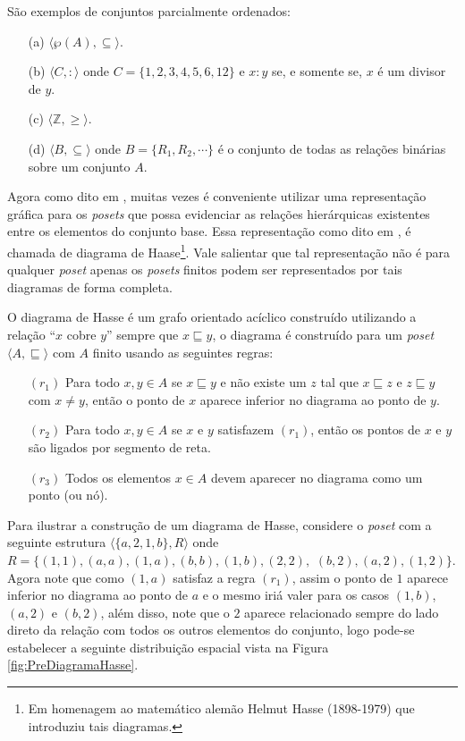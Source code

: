 \begin{exemplo}
	São exemplos de conjuntos parcialmente ordenados:
	\begin{itemize}
		\item[(a)] $\langle \wp(A), \subseteq \rangle$.
		\item[(b)] $\langle C,  : \rangle$ onde $C = \{1, 2, 3, 4, 5, 6, 12\}$ e $x : y$ se, e somente se, $x$ é um divisor de $y$.
		\item[(c)] $\langle \mathbb{Z}, \geq \rangle$.
		\item[(d)] $\langle B, \subseteq \rangle$ onde $B = \{R_1, R_2, \cdots\}$ é o conjunto de todas as relações binárias sobre um conjunto $A$.
	\end{itemize}
\end{exemplo}

Agora como dito em \cite{morgado1962poset}, muitas vezes é conveniente utilizar uma representação gráfica para os \textit{posets} que possa evidenciar as relações hierárquicas existentes entre os elementos do conjunto base. Essa representação como dito em \cite{abe1991-TC}, é chamada de diagrama de Haase\footnote{Em homenagem ao matemático alemão Helmut Hasse (1898-1979) que introduziu tais diagramas.}. Vale salientar que tal representação não é para qualquer \textit{poset} apenas os \textit{posets} finitos podem ser representados por tais diagramas de forma completa.

O diagrama de Hasse é um grafo orientado acíclico construído utilizando a relação ``$x$ cobre $y$'' sempre que $x \sqsubseteq y$, o diagrama é construído para um \textit{poset} $\langle A, \sqsubseteq \rangle$ com $A$ finito usando as seguintes regras:

\begin{itemize}
	\item[$(r_1)$] Para todo $x, y \in A$ se $x \sqsubseteq  y$ e não existe um $z$ tal que $x \sqsubseteq  z$ e $z \sqsubseteq  y$ com $x \neq y$, então o ponto de $x$ aparece inferior no diagrama ao ponto de $y$.
	\item[$(r_2)$] Para todo $x, y \in A$ se $x$ e $y$ satisfazem $(r_1)$, então os pontos de $x$ e $y$ são ligados por segmento de reta.
	\item[$(r_3)$] Todos os elementos $x \in A$ devem aparecer no diagrama como um ponto (ou nó).
\end{itemize}

Para ilustrar a construção de um diagrama de Hasse, considere o \textit{poset} com a seguinte estrutura $\langle \{a, 2, 1, b\}, R \rangle$ onde $R = \{(1, 1), (a, a), (1, a), (b, b), (1, b), (2, 2),$ $(b, 2), (a, 2), (1, 2)\}$. Agora note que como $(1, a)$ satisfaz a regra $(r_1)$, assim o ponto de $1$ aparece inferior no diagrama ao ponto de $a$ e o mesmo iriá valer para os casos $(1, b)$, $(a, 2)$ e $(b, 2)$, além disso, note que o $2$ aparece relacionado sempre do lado direto da relação com todos os outros elementos do conjunto, logo pode-se estabelecer a seguinte distribuição espacial vista na Figura \ref{fig:PreDiagramaHasse}.

